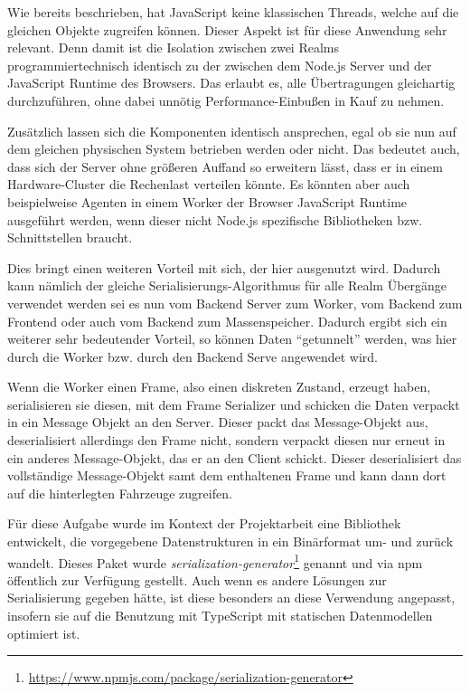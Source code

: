 \FloatBarrier

Wie bereits beschrieben, hat JavaScript keine klassischen Threads, welche auf die gleichen Objekte zugreifen können.
Dieser Aspekt ist für diese Anwendung sehr relevant.
Denn damit ist die Isolation zwischen zwei Realms programmiertechnisch identisch zu der zwischen dem Node.js Server und der JavaScript Runtime des Browsers.
Das erlaubt es, alle Übertragungen gleichartig durchzuführen, ohne dabei unnötig Performance-Einbußen in Kauf zu nehmen.

Zusätzlich lassen sich die Komponenten identisch ansprechen, egal ob sie nun auf dem gleichen physischen System betrieben werden oder nicht.
Das bedeutet auch, dass sich der Server ohne größeren Auffand so erweitern lässt, dass er in einem Hardware-Cluster die Rechenlast verteilen könnte.
Es könnten aber auch beispielweise Agenten in einem Worker der Browser JavaScript Runtime ausgeführt werden, wenn dieser nicht Node.js spezifische Bibliotheken bzw. Schnittstellen braucht.

Dies bringt einen weiteren Vorteil mit sich, der hier ausgenutzt wird.
Dadurch kann nämlich der gleiche Serialisierungs-Algorithmus für alle Realm Übergänge verwendet werden sei es nun vom Backend Server zum Worker, vom Backend zum Frontend oder auch vom Backend zum Massenspeicher.
Dadurch ergibt sich ein weiterer sehr bedeutender Vorteil, so können Daten \enquote{getunnelt} werden, was hier durch die Worker bzw. durch den Backend Serve angewendet wird.

Wenn die Worker einen Frame, also einen diskreten Zustand, erzeugt haben, serialisieren sie diesen, mit dem Frame Serializer und schicken die Daten verpackt in ein Message Objekt an den Server.
Dieser packt das Message-Objekt aus, deserialisiert allerdings den Frame nicht, sondern verpackt diesen nur erneut in ein anderes Message-Objekt, das er an den Client schickt.
Dieser deserialisiert das vollständige Message-Objekt samt dem enthaltenen Frame und kann dann dort auf die hinterlegten Fahrzeuge zugreifen.

Für diese Aufgabe wurde im Kontext der Projektarbeit eine Bibliothek entwickelt, die vorgegebene Datenstrukturen in ein Binärformat um- und zurück wandelt.
Dieses Paket wurde \textit{serialization-generator}\footnote{\url{https://www.npmjs.com/package/serialization-generator}} genannt und via npm öffentlich zur Verfügung gestellt.
Auch wenn es andere Lösungen zur Serialisierung gegeben hätte, ist diese besonders an diese Verwendung angepasst, insofern sie auf die Benutzung mit TypeScript mit statischen Datenmodellen optimiert ist.

